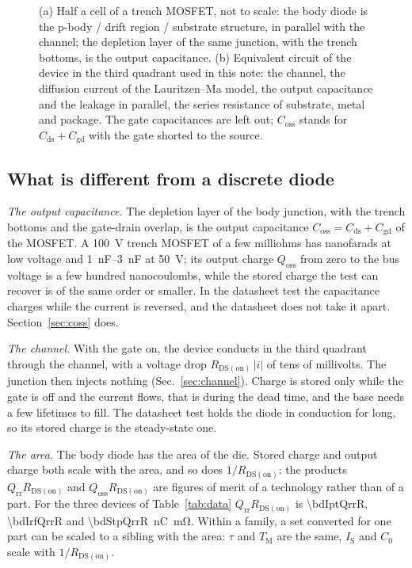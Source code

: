 \documentclass[10pt,a4paper]{scrartcl}
\newcommand{\Qrr}{Q_\mathrm{rr}}
\newcommand{\Qoss}{Q_\mathrm{oss}}
\newcommand{\Coss}{C_\mathrm{oss}}
\newcommand{\Cds}{C_\mathrm{ds}}
\newcommand{\Cgd}{C_\mathrm{gd}}
\newcommand{\TM}{T_\mathrm{M}}
\newcommand{\qE}{q_\mathrm{E}}
\newcommand{\qM}{q_\mathrm{M}}
\newcommand{\IS}{I_\mathrm{S}}
\newcommand{\Rds}{R_\mathrm{DS(on)}}
\newcommand{\Czero}{C_0}
\begin{document}
\begin{figure}[htb]
\caption{(a) Half a cell of a trench MOSFET, not to scale: the body diode is the p-body / drift region / substrate structure, in parallel with the channel; the depletion layer of the same junction, with the trench bottoms, is the output capacitance. (b) Equivalent circuit of the device in the third quadrant used in this note: the channel, the diffusion current of the Lauritzen--Ma model, the output capacitance and the leakage in parallel, the series resistance of substrate, metal and package. The gate capacitances are left out; $\Coss$ stands for $\Cds + \Cgd$ with the gate shorted to the source.}
\label{fig:structure}
\end{figure}

\subsection{What is different from a discrete diode}
\label{sec:different}
\emph{The output capacitance.} The depletion layer of the body junction, with the trench bottoms and the gate-drain overlap, is the output capacitance $\Coss = \Cds + \Cgd$ of the MOSFET. A \SI{100}{\volt} trench MOSFET of a few milliohms has nanofarads at low voltage and \SIrange{1}{3}{\nano\farad} at \SI{50}{\volt}; its output charge $\Qoss$ from zero to the bus voltage is a few hundred nanocoulombs, while the stored charge the test can recover is of the same order or smaller. In the datasheet test the capacitance charges while the current is reversed, and the datasheet does not take it apart. Section~\ref{sec:coss} does.

\emph{The channel.} With the gate on, the device conducts in the third quadrant through the channel, with a voltage drop $\Rds\,|i|$ of tens of millivolts. The junction then injects nothing (Sec.~\ref{sec:channel}). Charge is stored only while the gate is off and the current flows, that is during the dead time, and the base needs a few lifetimes to fill. The datasheet test holds the diode in conduction for long, so its stored charge is the steady-state one.

\emph{The area.} The body diode has the area of the die. Stored charge and output charge both scale with the area, and so does $1/\Rds$: the products $\Qrr\Rds$ and $\Qoss\Rds$ are figures of merit of a technology rather than of a part. For the three devices of Table~\ref{tab:data} $\Qrr\Rds$ is \num{\bdIptQrrR}, \num{\bdIrfQrrR} and \num{\bdStpQrrR}~\si{\nano\coulomb\milli\ohm}. Within a family, a set converted for one part can be scaled to a sibling with the area: $\tau$ and $\TM$ are the same, $\IS$ and $\Czero$ scale with $1/\Rds$.
\end{document}
